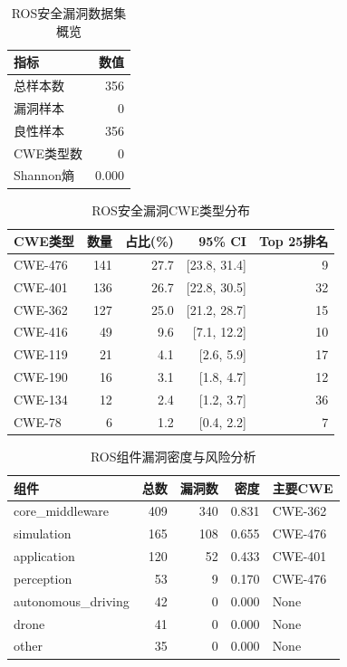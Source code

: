 
\begin{table}[htbp]
\centering
\caption{ROS安全漏洞数据集概览}
\label{tab:dataset_overview}
\begin{tabular}{lr}
\toprule
指标 & 数值 \\
\midrule
总样本数 & 356 \\
漏洞样本 & 0 \\
良性样本 & 356 \\
CWE类型数 & 0 \\
Shannon熵 & 0.000 \\
\bottomrule
\end{tabular}
\end{table}

\begin{table}[htbp]
\centering
\caption{ROS安全漏洞CWE类型分布}
\label{tab:cwe_distribution}
\begin{tabular}{lrrrr}
\toprule
CWE类型 & 数量 & 占比(\%) & 95\% CI & Top 25排名 \\
\midrule
CWE-476 & 141 & 27.7 & [23.8, 31.4] & 9 \\
CWE-401 & 136 & 26.7 & [22.8, 30.5] & 32 \\
CWE-362 & 127 & 25.0 & [21.2, 28.7] & 15 \\
CWE-416 & 49 & 9.6 & [7.1, 12.2] & 10 \\
CWE-119 & 21 & 4.1 & [2.6, 5.9] & 17 \\
CWE-190 & 16 & 3.1 & [1.8, 4.7] & 12 \\
CWE-134 & 12 & 2.4 & [1.2, 3.7] & 36 \\
CWE-78 & 6 & 1.2 & [0.4, 2.2] & 7 \\
\bottomrule
\end{tabular}
\end{table}

\begin{table}[htbp]
\centering
\caption{ROS组件漏洞密度与风险分析}
\label{tab:component_density}
\begin{tabular}{lrrrl}
\toprule
组件 & 总数 & 漏洞数 & 密度 & 主要CWE \\
\midrule
core_middleware & 409 & 340 & 0.831 & CWE-362 \\
simulation & 165 & 108 & 0.655 & CWE-476 \\
application & 120 & 52 & 0.433 & CWE-401 \\
perception & 53 & 9 & 0.170 & CWE-476 \\
autonomous_driving & 42 & 0 & 0.000 & None \\
drone & 41 & 0 & 0.000 & None \\
other & 35 & 0 & 0.000 & None \\
\bottomrule
\end{tabular}
\end{table}

